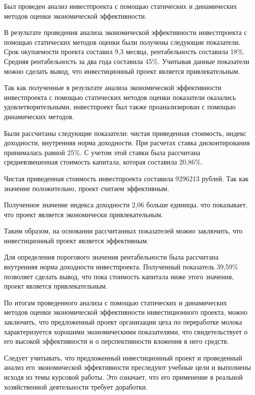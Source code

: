 Был проведен анализ инвестпроекта с помощью статических и динамических методов оценки экономической эффективности.

В результате проведения анализа экономической эффективности инвестпроекта с помощью статических методов оценки были получены следующие показатели. Срок окупаемости проекта составил 9,3 месяца, рентабельность составила 18\%. Средняя рентабельность за два года составила 45\%. Учитывая данные показатели можно сделать вывод, что инвестиционный проект является привлекательным.

Так как полученные в результате анализа экономической эффективности инвестпроекта с помощью статических методов оценки показатели оказались удовлетворительными, инвестпроект был также проанализирован с помощью динамических методов.

Были рассчитаны следующие показатели: чистая приведенная стоимость, индекс доходности, внутренняя норма доходности. При расчетах ставка дисконтирования принималась равной 25\%. С учетом этой ставки была рассчитана средневзвешенная стоимость капитала, которая составила 20,86\%.

Чистая приведенная стоимость инвестпроекта составила 9296213 рублей. Так как значение положительно, проект считаем эффективным.

Полученное значение индекса доходности 2,06 больше единицы, что показывает, что проект является экономически привлекательным.

Таким образом, на основании рассчитанных показателей можно заключить, что инвестиционный проект является эффективным.

Для определения порогового значения рентабельности была рассчитана внутренняя норма доходности инвестпроекта. Полученный показатель 39,59\% позволяет сделать вывод, что пока стоимость капитала ниже этого значения, проект является привлекательным.

По итогам проведенного анализа с помощью статических и динамических методов оценки экономической эффективности инвестиционного проекта, можно заключить, что предложенный проект организации цеха по переработке молока характеризуется хорошими экономическими показателями, что свидетельствует о его высокой эффективности и о перспективности вложения в него средств.

Следует учитывать, что предложенный инвестиционный проект и проведенный анализ его экономической эффективности преследуют учебные цели и выполнены исходя из темы курсовой работы. Это означает, что его применение в реальной хозяйственной деятельности требует доработки.

